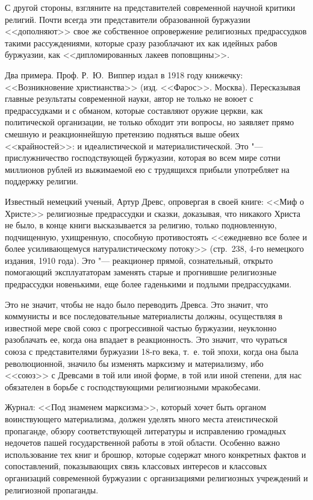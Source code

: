 С другой стороны, взгляните на представителей современной научной критики
религий. Почти всегда эти представители образованной буржуазии <<дополняют>>
свое же собственное опровержение религиозных предрассудков такими
рассуждениями, которые сразу разоблачают их как идейных рабов буржуазии,
как <<дипломированных лакеев поповщины>>.

Два примера. Проф. Р.~Ю.~Виппер издал в
1918 году книжечку: <<Возникновение христианства>> (изд. <<Фарос>>. Москва).
Пересказывая главные результаты современной науки, автор не только не воюет
с предрассудками и с обманом, которые составляют оружие церкви, как
политической организации, не только обходит эти вопросы, но заявляет прямо
смешную и реакционнейшую претензию подняться выше обеих <<крайностей>>: и
идеалистической и материалистической. Это "--- прислужничество господствующей
буржуазии, которая во всем мире сотни миллионов рублей из выжимаемой ею с
трудящихся прибыли употребляет на поддержку религии.

Известный немецкий ученый, Артур Древс, опровергая в своей книге: <<Миф о
Христе>> религиозные предрассудки и сказки, доказывая, что никакого Христа
не было, в конце книги высказывается за религию, только подновленную,
подчищенную, ухищренную, способную противостоять <<ежедневно все более и
более усиливающемуся натуралистическому потоку>> (стр.~238, 4-го немецкого
издания, 1910 года). Это "--- реакционер прямой, сознательный, открыто
помогающий эксплуататорам заменять старые и прогнившие религиозные
предрассудки новенькими, еще более гаденькими и подлыми предрассудками.

Это не значит, чтобы не надо было переводить Древса. Это значит, что
коммунисты и все последовательные материалисты должны, осуществляя в
известной мере свой союз с прогрессивной частью буржуазии, неуклонно
разоблачать ее, когда она впадает в реакционность. Это значит, что чураться
союза с представителями буржуазии 18-го века, т.~е. той эпохи, когда она
была революционной, значило бы изменять марксизму и материализму, ибо
<<союз>> с Древсами в той или иной форме, в той или иной степени, для нас
обязателен в борьбе с господствующими религиозными мракобесами.

Журнал: <<Под знаменем марксизма>>, который хочет быть органом воинствующего
материализма, должен уделять много места атеистической пропаганде, обзору
соответствующей литературы и исправлению громадных недочетов пашей
государственной работы в этой области. Особенно важно использование тех
книг и брошюр, которые содержат много конкретных фактов и сопоставлений,
показывающих связь классовых интересов и классовых организаций современной
буржуазии с организациями религиозных учреждений и религиозной пропаганды.

